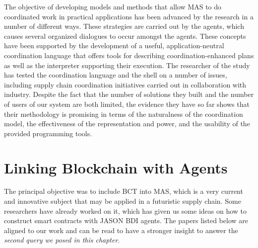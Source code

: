 \begin{itemize}[label={}]
The objective of developing models and methods that allow \ac{MAS} to do coordinated work in practical applications has been advanced by the research in a number of different ways. These strategies are carried out by the agents, which causes several organized dialogues to occur amongst the agents. These concepts have been supported by the development of a useful, application-neutral coordination language that offers tools for describing coordination-enhanced plans as well as the interpreter supporting their execution. The researcher of the study has tested the coordination language and the shell on a number of issues, including supply chain coordination initiatives carried out in collaboration with industry. Despite the fact that the number of solutions they built and the number of users of our system are both limited, the evidence they have so far shows that their methodology is promising in terms of the naturalness of the coordination model, the effectiveness of the representation and power, and the usability of the provided programming tools.
\end{itemize}

\section{Linking Blockchain with Agents}

The principal objective was to include BCT into MAS, which is a very current and innovative subject that may be applied in a futuristic supply chain. Some researchers have already worked on it, which has given us some ideas on how to construct smart contracts with JASON BDI agents. The papers listed below are aligned to our work and can be read to have a stronger insight to answer the \textit{second query we posed in this chapter}.

